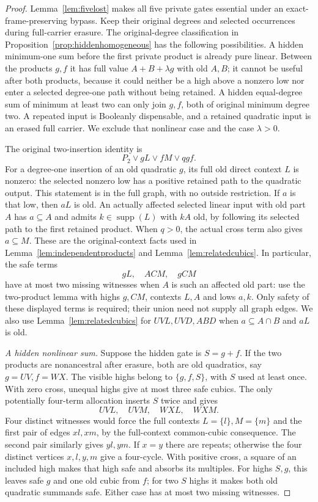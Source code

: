 \documentclass[11pt]{article}
\newcommand{\supp}{\operatorname{supp}}
\theoremstyle{definition}
\theoremstyle{remark}
\begin{document}
\begin{proof}
Lemma~\ref{lem:fivelost} makes all five private gates essential under an exact-frame-preserving bypass. Keep their original degrees and selected occurrences during full-carrier erasure. The original-degree classification in Proposition~\ref{prop:hiddenhomogeneous} has the following possibilities. A hidden minimum-one sum before the first private product is already pure linear. Between the products $g,f$ it has full value $A+B+\lambda g$ with old $A,B$; it cannot be useful after both products, because it could neither be a high above a nonzero low nor enter a selected degree-one path without being retained. A hidden equal-degree sum of minimum at least two can only join $g,f$, both of original minimum degree two. A repeated input is Booleanly dispensable, and a retained quadratic input is an erased full carrier. We exclude that nonlinear case and the case $\lambda>0$.

The original two-insertion identity is
\[
 P_2\vee gL\vee fM\vee qgf.
\]
For a degree-one insertion of an old quadratic $g$, its full old direct context $L$ is nonzero: the selected nonzero low has a positive retained path to the quadratic output. This statement is in the full graph, with no outside restriction. If $a$ is that low, then $aL$ is old. An actually affected selected linear input with old part $A$ has $a\subseteq A$ and admits $k\in\supp(L)$ with $kA$ old, by following its selected path to the first retained product. When $q>0$, the actual cross term also gives $a\subseteq M$. These are the original-context facts used in Lemma~\ref{lem:independentproducts} and Lemma~\ref{lem:relatedcubics}. In particular, the safe terms
\[
 gL,\quad ACM,\quad gCM
\]
have at most two missing witnesses when $A$ is such an affected old part: use the two-product lemma with highs $g,CM$, contexts $L,A$ and lows $a,k$. Only safety of these displayed terms is required; their union need not supply all graph edges. We also use Lemma~\ref{lem:relatedcubics} for $UVL,UVD,ABD$ when $a\subseteq A\cap B$ and $aL$ is old.

\emph{A hidden nonlinear sum.} Suppose the hidden gate is $S=g+f$. If the two products are nonancestral after erasure, both are old quadratics, say $g=UV,f=WX$. The visible highs belong to $\{g,f,S\}$, with $S$ used at least once. With zero cross, unequal highs give at most three safe cubics. The only potentially four-term allocation inserts $S$ twice and gives
\[
 UVL,\quad UVM,\quad WXL,\quad WXM.
\]
Four distinct witnesses would force the full contexts $L=\{l\},M=\{m\}$ and the first pair of edges $xl,xm$, by the full-context common-cubic consequence. The second pair similarly gives $yl,ym$. If $x=y$ there are repeats; otherwise the four distinct vertices $x,l,y,m$ give a four-cycle. With positive cross, a square of an included high makes that high safe and absorbs its multiples. For highs $S,g$, this leaves safe $g$ and one old cubic from $f$; for two $S$ highs it makes both old quadratic summands safe. Either case has at most two missing witnesses.


\end{proof}
\end{document}
